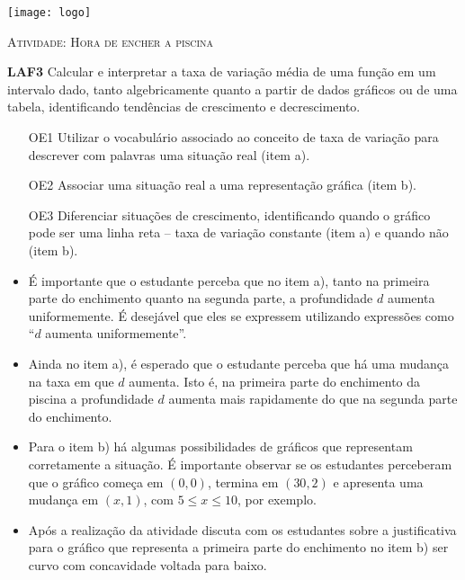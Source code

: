 \documentclass[10 pt,usenames,dvipsnames, oneside]{article}
\begin{document}
\begin{center}
  \begin{minipage}[l]{3cm}
\texttt{[image: logo]}    
\end{minipage}\hfill
\begin{minipage}[r]{.8\textwidth}
 {\Large \scshape Atividade: Hora de encher a piscina}  
\end{minipage}
\end{center}
\vspace{.2cm}

\ifdefined\prof
\begin{objetivos}
\item \textbf{LAF3} Calcular e interpretar a taxa de variação média de uma função em um intervalo dado, tanto algebricamente quanto a partir de dados gráficos ou de uma tabela, identificando tendências de crescimento e decrescimento.
\end{objetivos}

\begin{goals}
\begin{enumerate}

\item [OE1] Utilizar o vocabulário associado ao conceito de taxa de variação para descrever com palavras uma situação real (item a).

\item [OE2] Associar uma situação real a uma representação gráfica (item b).

\item [OE3] Diferenciar situações de crescimento, identificando quando o gráfico pode ser uma linha reta – taxa de variação constante (item a) e quando não (item b).

\end{enumerate}

\tcblower
\begin{itemize}
\item É importante que o estudante perceba que no item a), tanto na primeira parte do
enchimento quanto na segunda parte, a profundidade $d$ aumenta uniformemente. É
desejável que eles se expressem utilizando expressões como “$d$ aumenta
uniformemente”.
\item Ainda no item a), é esperado que o estudante perceba que há uma mudança na taxa em
que $d$ aumenta. Isto é, na primeira parte do enchimento da piscina a profundidade $d$
aumenta mais rapidamente do que na segunda parte do enchimento.
\item Para o item b) há algumas possibilidades de gráficos que representam corretamente a
situação. É importante observar se os estudantes perceberam que o gráfico começa em
$(0,0)$, termina em $(30,2)$ e apresenta uma mudança em $(x, 1)$, com $5\leq x \leq 10$, por
exemplo.
\item Após a realização da atividade discuta com os estudantes sobre a justificativa para o
gráfico que representa a primeira parte do enchimento no item b) ser curvo com
concavidade voltada para baixo.
\end{itemize}

\end{goals}
\end{document}
